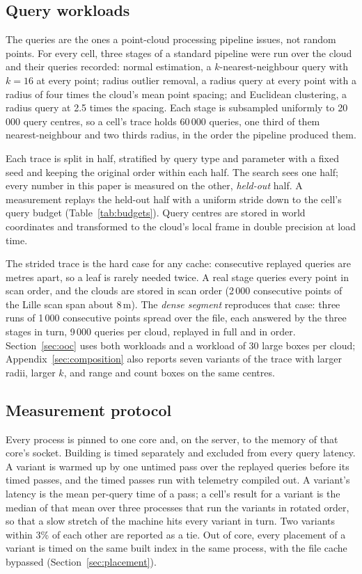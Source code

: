 \subsection{Query workloads}\label{sec:workloads}

The queries are the ones a point-cloud processing pipeline issues, not random points. For every cell, three stages of a standard pipeline were run over the cloud and their queries recorded: normal estimation, a $k$-nearest-neighbour query with $k = 16$ at every point; radius outlier removal, a radius query at every point with a radius of four times the cloud's mean point spacing; and Euclidean clustering, a radius query at 2.5 times the spacing. Each stage is subsampled uniformly to 20\,000 query centres, so a cell's trace holds 60\,000 queries, one third of them nearest-neighbour and two thirds radius, in the order the pipeline produced them.

Each trace is split in half, stratified by query type and parameter with a fixed seed and keeping the original order within each half. The search sees one half; every number in this paper is measured on the other, \emph{held-out} half. A measurement replays the held-out half with a uniform stride down to the cell's query budget (Table~\ref{tab:budgets}). Query centres are stored in world coordinates and transformed to the cloud's local frame in double precision at load time.

The strided trace is the hard case for any cache: consecutive replayed queries are metres apart, so a leaf is rarely needed twice. A real stage queries every point in scan order, and the clouds are stored in scan order (2\,000 consecutive points of the Lille scan span about 8\,m). The \emph{dense segment} reproduces that case: three runs of 1\,000 consecutive points spread over the file, each answered by the three stages in turn, 9\,000 queries per cloud, replayed in full and in order. Section~\ref{sec:ooc} uses both workloads and a workload of 30 large boxes per cloud; Appendix~\ref{sec:composition} also reports seven variants of the trace with larger radii, larger $k$, and range and count boxes on the same centres.

\subsection{Measurement protocol}\label{sec:protocol}

Every process is pinned to one core and, on the server, to the memory of that core's socket. Building is timed separately and excluded from every query latency. A variant is warmed up by one untimed pass over the replayed queries before its timed passes, and the timed passes run with telemetry compiled out. A variant's latency is the mean per-query time of a pass; a cell's result for a variant is the median of that mean over three processes that run the variants in rotated order, so that a slow stretch of the machine hits every variant in turn. Two variants within 3\% of each other are reported as a tie. Out of core, every placement of a variant is timed on the same built index in the same process, with the file cache bypassed (Section~\ref{sec:placement}).

